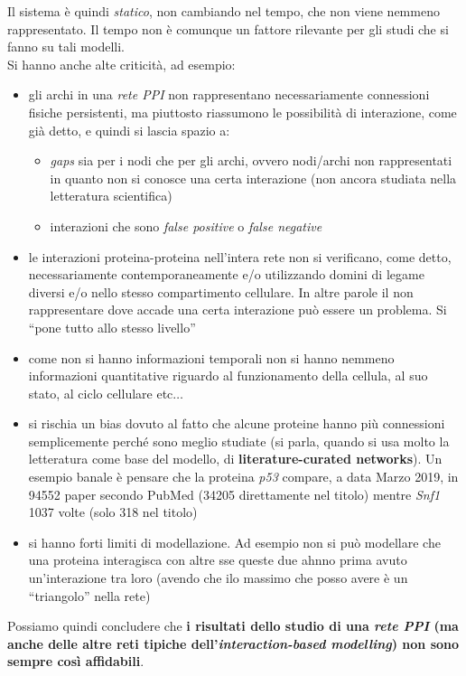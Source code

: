 \documentclass[a4paper,12pt, oneside]{book}
\begin{document}
Il sistema è quindi \textit{statico}, non cambiando nel tempo, che non viene
nemmeno rappresentato. Il tempo non è comunque un fattore rilevante per gli
studi che si fanno su tali modelli. \\
Si hanno anche alte criticità, ad esempio:
\begin{itemize}
  \item gli archi in una \textit{rete PPI} non rappresentano necessariamente
  connessioni fisiche persistenti, ma piuttosto riassumono le possibilità di
  interazione, come già detto, e quindi si lascia spazio a:
  \begin{itemize}
    \item \textit{gaps} sia per i nodi che per gli archi, ovvero nodi/archi non
    rappresentati in quanto non si conosce una certa interazione (non ancora
    studiata nella letteratura scientifica)
    \item interazioni che sono \textit{false positive} o \textit{false negative}
  \end{itemize}
  \item le interazioni proteina-proteina nell'intera rete non si verificano,
  come detto,
  necessariamente contemporaneamente e/o utilizzando domini di legame diversi
  e/o nello stesso compartimento cellulare. In altre parole il non rappresentare
  dove accade una certa interazione può essere un problema. Si ``pone tutto allo
  stesso livello''
  \item come non si hanno informazioni temporali non si hanno nemmeno
  informazioni quantitative riguardo al funzionamento della cellula, al suo
  stato, al ciclo cellulare etc$\ldots$
  \item si rischia un bias dovuto al fatto che alcune proteine hanno più
  connessioni semplicemente perché sono meglio studiate (si parla, quando si usa
  molto la letteratura come base del modello, di \textbf{literature-curated
    networks}). Un esempio banale è pensare che la proteina \textit{p53}
  compare, a data Marzo 2019, in 94552 paper secondo PubMed (34205 direttamente
  nel titolo) mentre \textit{Snf1} 1037 volte (solo 318 nel titolo)
  \item si hanno forti limiti di modellazione. Ad esempio non si può modellare
  che una proteina interagisca con altre sse queste due ahnno prima avuto
  un'interazione tra loro (avendo che ilo massimo che posso avere è un
  ``triangolo'' nella rete)
\end{itemize}
Possiamo quindi concludere che \textbf{i risultati dello studio di una
  \textit{rete PPI} (ma anche delle altre reti tipiche
  dell'\textit{interaction-based modelling}) non sono sempre così affidabili}.
\end{document}
